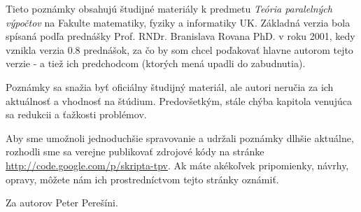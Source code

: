 \documentclass[a4paper]{report}
\begin{document}
Tieto poznámky obsahujú študijné materiály k predmetu 
\emph{Teória paralelných výpočtov}
na Fakulte matematiky, fyziky a informatiky UK.
Základná verzia bola spísaná podľa prednášky
Prof. RNDr. Branislava Rovana PhD. v
roku 2001, kedy vznikla verzia 0.8 prednášok, za čo by som chcel
poďakovať hlavne autorom tejto verzie -  a tiež ich
predchodcom (ktorých mená upadli do zabudnutia).

Poznámky sa snažia byť oficiálny študijný materiál, ale
autori neručia za ich aktuálnosť a vhodnosť na štúdium. Predovšetkým,
stále chýba kapitola venujúca sa redukcii a ťažkosti problémov.

Aby sme umožnoli jednoduchšie spravovanie a udržali poznámky dlhšie
aktuálne, rozhodli sme sa verejne publikovať zdrojové kódy na stránke
\url{http://code.google.com/p/skripta-tpv}. Ak máte akékoľvek pripomienky,
návrhy, opravy, môžete nám ich prostredníctvom tejto stránky oznámiť.

Za autorov Peter Perešíni.


\tableofcontents













\end{document}
